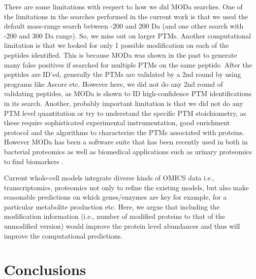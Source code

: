\documentclass[12pt]{article}
\begin{document}

There are some limitations with respect to how we did MODa searches. One of the limitations in the searches performed in the current work is that we used the default mass-range search between -200 and 200 Da (and one other search with -200 and 300 Da range). So, we miss out on larger PTMs. Another computational limitation is that we looked for only 1 possible modification on each of the peptides identified. This is because MODa was shown in the past to generate many false positives if searched for multiple PTMs on the same peptide. After the peptides are ID'ed, generally the PTMs are validated by a 2nd round by using programs like Ascore etc. However here, we did not do any 2nd round of validating peptides, as MODa is shown to ID high-confidence PTM identifications in its search. Another, probably important limitation is that we did not do any PTM level quantitation or try to understand the specific PTM stoichiometry, as these require sophisticated experimental instrumentation, good enrichment protocol and the algorithms to characterize the PTMs associated with proteins. However MODa has been a software suite that has been recently used in both in bacterial proteomics as well as biomedical applications such as urinary proteomics to find biomarkers \cite{Liuetal2013}.

Current whole-cell models \cite{Covertetal2008} integrate diverse kinds of OMICS data i.e., transcriptomics, proteomics not only to refine the existing models, but also make reasonable predictions on which genes/enzymes are key for example, for a particular metabolite production etc. Here, we argue that including the modification information (i.e., number of modified proteins to that of the unmodified version) would improve the protein level abundances and thus will improve the computational predictions.

\section{Conclusions}
\end{document}
